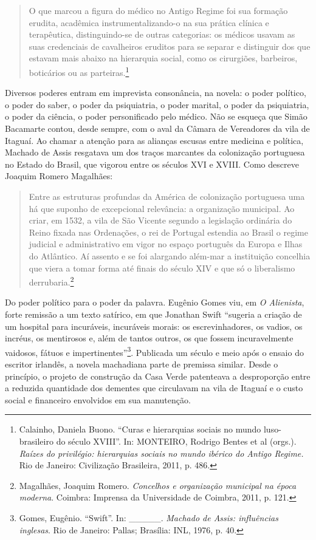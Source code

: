 \begin{quote}
O que marcou a figura do médico no Antigo Regime foi sua formação
erudita, acadêmica instrumentalizando-o na sua prática clínica e
terapêutica, distinguindo-se de outras categorias: os médicos usavam as
suas credenciais de cavalheiros eruditos para se separar e distinguir
dos que estavam mais abaixo na hierarquia social, como os cirurgiões,
barbeiros, boticários ou as parteiras.\footnote{Calainho, Daniela Buono.
  ``Curas e hierarquias sociais no mundo luso-brasileiro do século
  XVIII''. In: MONTEIRO, Rodrigo Bentes et al (orgs.). \emph{Raízes do
  privilégio: hierarquias sociais no mundo ibérico do Antigo Regime.}
  Rio de Janeiro: Civilização Brasileira, 2011, p. 486.}
\end{quote}

Diversos poderes entram em imprevista consonância, na novela: o poder
político, o poder do saber, o poder da psiquiatria, o poder marital, o
poder da psiquiatria, o poder da ciência, o poder personificado pelo
médico. Não se esqueça que Simão Bacamarte contou, desde sempre, com o
aval da Câmara de Vereadores da vila de Itaguaí. Ao chamar a atenção
para as alianças escusas entre medicina e política, Machado de Assis
resgatava um dos traços marcantes da colonização portuguesa no Estado do
Brasil, que vigorou entre os séculos XVI e XVIII. Como descreve Joaquim
Romero Magalhães:

\begin{quote}
Entre as estruturas profundas da América de colonização portuguesa uma
há que suponho de excepcional relevância: a organização municipal. Ao
criar, em 1532, a vila de São Vicente segundo a legislação ordinária do
Reino fixada nas Ordenações, o rei de Portugal estendia ao Brasil o
regime judicial e administrativo em vigor no espaço português da Europa
e Ilhas do Atlântico. Aí assento e se foi alargando além-mar a
instituição concelhia que viera a tomar forma até finais do século XIV e
que só o liberalismo derrubaria.\footnote{Magalhães, Joaquim Romero.
  \emph{Concelhos e organização municipal na época moderna}. Coimbra:
  Imprensa da Universidade de Coimbra, 2011, p. 121.}
\end{quote}

Do poder político para o poder da palavra. Eugênio Gomes viu, em \emph{O
Alienista}, forte remissão a um texto satírico, em que Jonathan Swift
``sugeria a criação de um hospital para incuráveis, incuráveis morais:
os escrevinhadores, os vadios, os incréus, os mentirosos e, além de
tantos outros, os que fossem incuravelmente vaidosos, fátuos e
impertinentes''\footnote{Gomes, Eugênio. ``Swift''. In: \_\_\_\_\_.
  \emph{Machado de Assis: influências inglesas}. Rio de Janeiro: Pallas;
  Brasília: INL, 1976, p. 40.}. Publicada um século e meio após o ensaio
do escritor irlandês, a novela machadiana parte de premissa similar.
Desde o princípio, o projeto de construção da Casa Verde patenteava a
desproporção entre a reduzida quantidade dos dementes que circulavam na
vila de Itaguaí e o custo social e financeiro envolvidos em sua
manutenção.

